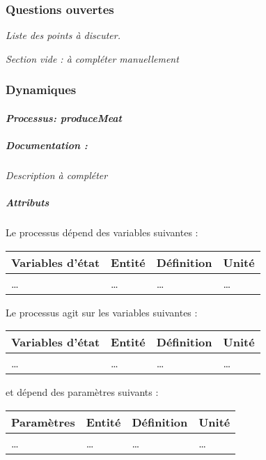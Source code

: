 \documentclass[
]{article}
\begin{document}
\subsubsection{Questions ouvertes}\label{questions-ouvertes-4}

\emph{Liste des points à discuter.}

\emph{Section vide : à compléter manuellement}

\subsubsection{Dynamiques}\label{dynamiques-4}

\paragraph{\texorpdfstring{\emph{Processus:
produceMeat}}{Processus: produceMeat}}\label{processus-producemeat}

\subparagraph{Documentation :}\label{documentation-6}

\emph{Description à compléter}

\subparagraph{Attributs}\label{attributs-6}

Le processus dépend des variables suivantes :

\begin{longtable}[]{@{}llll@{}}
\toprule\noalign{}
\textbf{Variables d'état} & \textbf{Entité} & \textbf{Définition} &
\textbf{Unité} \\
\midrule\noalign{}
\endhead
\bottomrule\noalign{}
\endlastfoot
\ldots{} & \ldots{} & \ldots{} & \ldots{} \\
\end{longtable}

Le processus agit sur les variables suivantes :

\begin{longtable}[]{@{}llll@{}}
\toprule\noalign{}
\textbf{Variables d'état} & \textbf{Entité} & \textbf{Définition} &
\textbf{Unité} \\
\midrule\noalign{}
\endhead
\bottomrule\noalign{}
\endlastfoot
\ldots{} & \ldots{} & \ldots{} & \ldots{} \\
\end{longtable}

et dépend des paramètres suivants :

\begin{longtable}[]{@{}llll@{}}
\toprule\noalign{}
\textbf{Paramètres} & \textbf{Entité} & \textbf{Définition} &
\textbf{Unité} \\
\midrule\noalign{}
\endhead
\bottomrule\noalign{}
\endlastfoot
\ldots{} & \ldots{} & \ldots{} & \ldots{} \\
\end{longtable}
\end{document}
